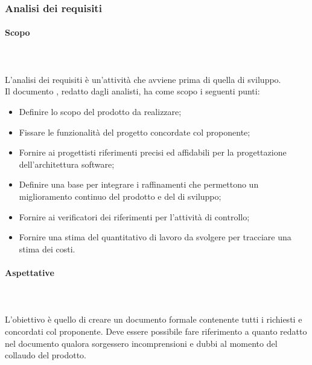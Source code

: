 \subsubsection{Analisi dei requisiti}
\paragraph{Scopo}\mbox{}\\ \\
L'analisi dei requisiti è un'attività che avviene prima di quella di sviluppo.\\
Il documento \AdR{}, redatto dagli analisti, ha come scopo i seguenti punti:
\begin{itemize}
\item Definire lo scopo del prodotto da realizzare;
\item Fissare le funzionalità del progetto concordate col proponente;
\item Fornire ai progettisti riferimenti precisi ed affidabili per la progettazione dell'architettura software;
\item Definire una base per integrare i raffinamenti che permettono un miglioramento continuo del prodotto e del  di sviluppo;
\item Fornire ai verificatori dei riferimenti per l’attività di controllo;
\item Fornire una stima del quantitativo di lavoro da svolgere per tracciare una stima dei costi. 
\end{itemize}

\paragraph{Aspettative}\mbox{}\\ \\
L'obiettivo è quello di creare un documento formale contenente tutti i  richiesti e concordati col proponente.
Deve essere possibile fare riferimento a quanto redatto nel documento \AdR{} qualora sorgessero incomprensioni e dubbi al momento del collaudo del prodotto.

